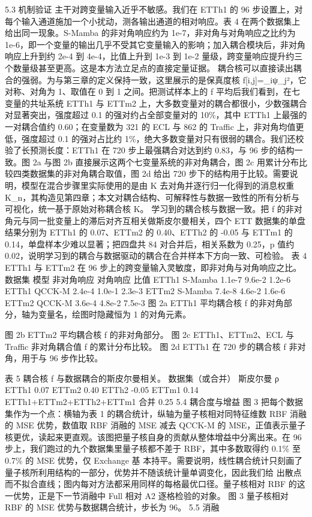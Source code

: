 \documentclass[
]{article}
\begin{document}
5.3 机制验证 主干对跨变量输入近乎不敏感。我们在 ETTh1 的 96
步设置上，对每个输入通道施加一个小扰动，测各输出通道的相对响应。表 4
在两个数据集上给出同一现象。S-Mamba 的非对角响应约为
1e-7，非对角与对角响应之比约为
1e-6，即一个变量的输出几乎不受其它变量输入的影响；加入耦合模块后，非对角响应上升到约
2e-4 到 4e-4，比值上升到 1e-3 到 1e-2
量级，跨变量响应提升约三个数量级甚至更高。这是本方法立足点的直接定量证据。
耦合核可以直接读出耦合的强弱。为与第三章的定义保持一致，这里展示的是保真度核
f{[}i,j{]}=\_i\textbar ψ\_j\textbar²，它对称、对角为 1、取值在
0 到 1 之间。把测试样本上的 f 平均后我们看到，在七变量的共址系统 ETTh1
与 ETTm2 上，大多数变量对的耦合都很小，少数强耦合对显著突出，强度超过
0.1 的强对约占全部变量对的 10\%，其中 ETTh1 上最强的一对耦合值约
0.60；在变量数为 321 的 ECL 与 862 的 Traffic
上，非对角均值更低，强度超过 0.1 的强对占比约
1\%，绝大多数变量对只有很弱的耦合。我们还校验了长预测长度：ETTh1 在 720
步上最强耦合对达到约 0.83，与 96 步的结构一致。图 2a 与图 2b
直接展示这两个七变量系统的非对角耦合，图 2c
用累计分布比较四类数据集的非对角耦合取值，图 2d 给出 720
步下的结构用于比较。需要说明，模型在混合步骤里实际使用的是由 K
去对角并逐行归一化得到的消息权重
K\_n，其构造见第四章；本文对耦合结构、可解释性与数据一致性的所有分析与可视化，统一基于原始对称耦合核
K。 学习到的耦合核与数据一致。把 f
的非对角元与同一批变量上的滞后对齐互相关做斯皮尔曼相关，四个 ETT
数据集的单盘结果分别为 ETTh1 的 0.07、ETTm2 的 0.40、ETTh2 的 -0.05 与
ETTm1 的 0.14，单盘样本少难以显著；把四盘共 84 对合并后，相关系数为
0.25，p 值约
0.02，说明学习到的耦合与数据驱动的耦合在合并样本下方向一致、可检验。 表
4 ETTh1 与 ETTm2 在 96 步上的跨变量输入灵敏度，即非对角与对角响应之比。
数据集 模型 非对角响应 对角响应 比值 ETTh1 S-Mamba 1.1e-7 9.6e-2 1.2e-6
ETTh1 QCCK-M 2.4e-4 1.0e-1 2.3e-3 ETTm2 S-Mamba 7.4e-8 4.6e-2 1.6e-6
ETTm2 QCCK-M 3.6e-4 4.8e-2 7.5e-3 图 2a ETTh1 平均耦合核 f
的非对角部分，轴为变量名，绘图时隐藏恒为 1 的对角元素。

图 2b ETTm2 平均耦合核 f 的非对角部分。 图 2c ETTh1、ETTm2、ECL 与
Traffic 非对角耦合值 f 的累计分布比较。 图 2d ETTh1 在 720 步的耦合核 f
非对角，用于与 96 步作比较。

表 5 耦合核 f 与数据耦合的斯皮尔曼相关。 数据集（或合并） 斯皮尔曼 ρ
ETTh1 0.07 ETTm2 0.40 ETTh2 -0.05 ETTm1 0.14 ETTh1+ETTm2+ETTh2+ETTm1
合并 0.25 5.4 耦合度与增益 图 3 把每个数据集作为一个点：横轴为表 1
的耦合统计，纵轴为量子核相对同特征维数 RBF 消融的 MSE 优势，数值取 RBF
消融的 MSE 减去 QCCK-M 的
MSE，正值表示量子核更优，读起来更直观。该图把量子核自身的贡献从整体增益中分离出来。在
96 步上，我们跑过的九个数据集里量子核都不差于 RBF，其中多数取得约 0.1\%
至 0.7\% 的 MSE 优势，仅 Exchange 基
本持平。需要说明，线性耦合统计只刻画了量子核所利用结构的一部分，优势并不随该统计量单调变化，因此我们给
出散点而不拟合直线；图内每对方法都采用同样的每格最优口径。量子核相对 RBF
的这一优势，正是下一节消融中 Full 相对 A2 逐格检验的对象。 图 3
量子核相对 RBF 的 MSE 优势与数据耦合统计，步长为 96。 5.5 消融
\end{document}
